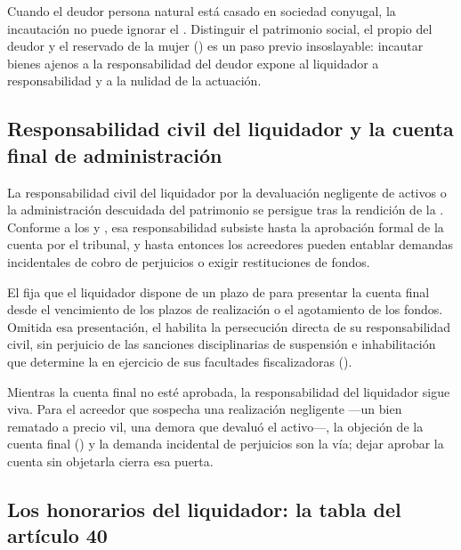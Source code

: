 \begin{alerta}
Cuando el deudor persona natural está casado en sociedad conyugal, la incautación no puede
ignorar el . Distinguir el patrimonio social, el propio del deudor y el reservado de
la mujer () es un paso previo insoslayable: incautar bienes ajenos a la
responsabilidad del deudor expone al liquidador a responsabilidad y a la nulidad de la actuación.
\end{alerta}

\subsection{Responsabilidad civil del liquidador y la cuenta final de administración}

La responsabilidad civil del liquidador por la devaluación negligente de activos o la
administración descuidada del patrimonio se persigue tras la rendición de la . Conforme a los  y , esa responsabilidad subsiste
hasta la aprobación formal de la cuenta por el tribunal, y hasta entonces los acreedores pueden
entablar demandas incidentales de cobro de perjuicios o exigir restituciones de fondos.

El  fija que el liquidador dispone de un plazo de  para
presentar la cuenta final desde el vencimiento de los plazos de realización o el agotamiento de
los fondos. Omitida esa presentación, el  habilita la persecución directa de su
responsabilidad civil, sin perjuicio de las sanciones disciplinarias de suspensión e
inhabilitación que determine la \superir{} en ejercicio de sus facultades fiscalizadoras
().

\begin{foco}
Mientras la cuenta final no esté aprobada, la responsabilidad del liquidador sigue viva. Para
el acreedor que sospecha una realización negligente ---un bien rematado a precio vil, una
demora que devaluó el activo---, la objeción de la cuenta final () y la demanda
incidental de perjuicios son la vía; dejar aprobar la cuenta sin objetarla cierra esa puerta.
\end{foco}

\subsection{Los honorarios del liquidador: la tabla del artículo 40}

